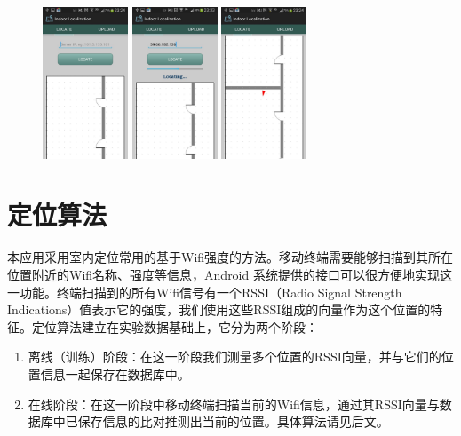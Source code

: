 \documentclass[a4paper,10pt]{article}
\begin{document}
\begin{CJK*}{UTF8}{gbsn}
\begin{figure}
\begin{minipage}[t]{0.3\linewidth}
\centering
\includegraphics[width=1in]{4.jpg}
\end{minipage}
\begin{minipage}[t]{0.3\linewidth}
\centering
\includegraphics[width=1in]{5.jpg}
\end{minipage}
\begin{minipage}[t]{0.3\linewidth}
\centering
\includegraphics[width=1in]{6.jpg}
\end{minipage}
\end{figure}


\section{定位算法}

本应用采用室内定位常用的基于Wifi强度的方法\cite{1}。移动终端需要能够扫描到其所在位置附近的Wifi名称、强度等信息，Android 系统提供的接口可以很方便地实现这一功能。终端扫描到的所有Wifi信号有一个RSSI（Radio Signal Strength Indications）值表示它的强度，我们使用这些RSSI组成的向量作为这个位置的特征。定位算法建立在实验数据基础上，它分为两个阶段：
\begin{enumerate}[1)]
\item 离线（训练）阶段：在这一阶段我们测量多个位置的RSSI向量，并与它们的位置信息一起保存在数据库中。
\item 在线阶段：在这一阶段中移动终端扫描当前的Wifi信息，通过其RSSI向量与数据库中已保存信息的比对推测出当前的位置。具体算法请见后文。
\end{enumerate}


\end{CJK*}
\end{document}
